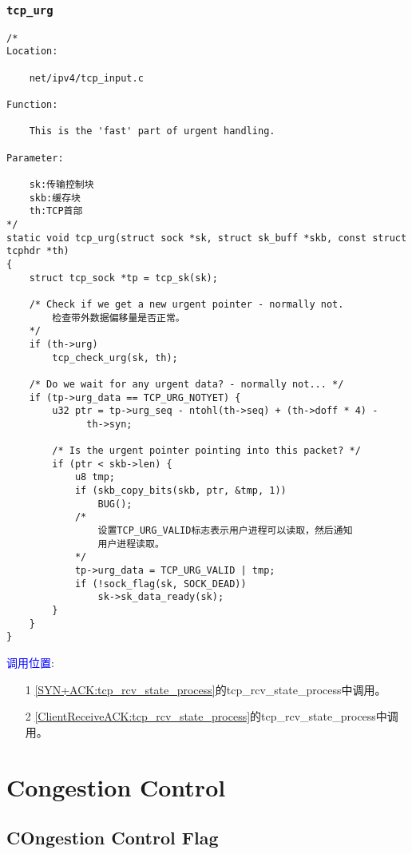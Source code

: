         \subsubsection{\texttt{tcp_urg}}
            \label{TCPUrgent:tcp_urg}
\begin{verbatim}
/*
Location:

    net/ipv4/tcp_input.c

Function:

    This is the 'fast' part of urgent handling. 

Parameter:

    sk:传输控制块
    skb:缓存块
    th:TCP首部
*/
static void tcp_urg(struct sock *sk, struct sk_buff *skb, const struct tcphdr *th)
{
    struct tcp_sock *tp = tcp_sk(sk);

    /* Check if we get a new urgent pointer - normally not. 
        检查带外数据偏移量是否正常。
    */
    if (th->urg)
        tcp_check_urg(sk, th);

    /* Do we wait for any urgent data? - normally not... */
    if (tp->urg_data == TCP_URG_NOTYET) {
        u32 ptr = tp->urg_seq - ntohl(th->seq) + (th->doff * 4) -
              th->syn;

        /* Is the urgent pointer pointing into this packet? */
        if (ptr < skb->len) {
            u8 tmp;
            if (skb_copy_bits(skb, ptr, &tmp, 1))
                BUG();
            /*
                设置TCP_URG_VALID标志表示用户进程可以读取，然后通知
                用户进程读取。
            */
            tp->urg_data = TCP_URG_VALID | tmp;
            if (!sock_flag(sk, SOCK_DEAD))
                sk->sk_data_ready(sk);
        }
    }
}
\end{verbatim}    

        \textcolor{blue}{调用位置}:

            \begin{enumerate}
                \item[1]        \ref{SYN+ACK:tcp_rcv_state_process}的tcp\_rcv\_state\_process中调用。
                \item[2]        \ref{ClientReceiveACK:tcp_rcv_state_process}的tcp\_rcv\_state\_process中调用。              
            \end{enumerate}


\section{Congestion Control}
	\subsection{COngestion Control Flag}
